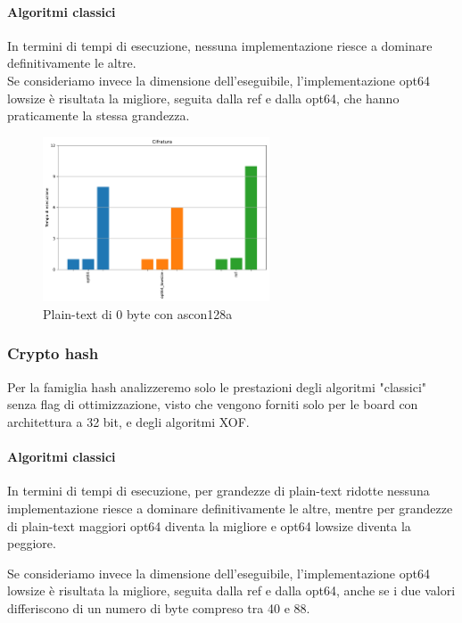 \documentclass[12pt,a4paper,italian]{report}
\begin{document}
\paragraph{Algoritmi classici}

In termini di tempi di esecuzione, nessuna implementazione riesce a dominare definitivamente le altre. \\

\noindent Se consideriamo invece la dimensione dell'eseguibile, l'implementazione opt64 lowsize è risultata la migliore, seguita dalla ref e dalla opt64, che hanno praticamente la stessa grandezza.

\begin{figure}[H]
    \centering
    \includegraphics[width=0.6\textwidth]{raspberry/ascon128a.pdf}
    \caption{Plain-text di 0 byte con ascon128a}
\end{figure}

\subsubsection{Crypto hash}

Per la famiglia hash analizzeremo solo le prestazioni degli algoritmi "classici" senza flag di ottimizzazione, visto che vengono forniti solo per le board con architettura a 32 bit, e degli algoritmi XOF.

\paragraph{Algoritmi classici}

In termini di tempi di esecuzione, per grandezze di plain-text ridotte nessuna implementazione riesce a dominare definitivamente le altre, mentre per grandezze di plain-text maggiori opt64 diventa la migliore e opt64 lowsize diventa la peggiore.

\noindent Se consideriamo invece la dimensione dell'eseguibile, l'implementazione opt64 lowsize è risultata la migliore, seguita dalla ref e dalla opt64, anche se i due valori differiscono di un numero di byte compreso tra 40 e 88.
\end{document}
